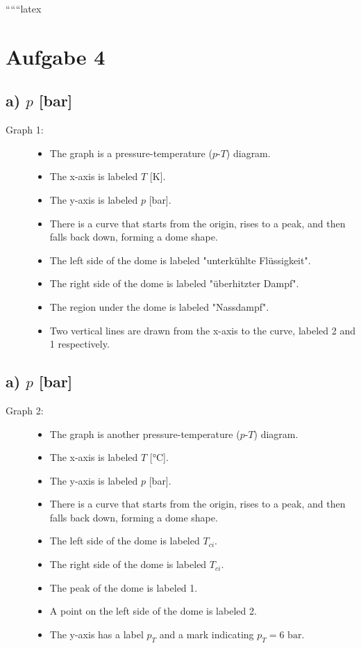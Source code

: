 
``````latex


\section*{Aufgabe 4}

\subsection*{a) $p$ [bar]}

\begin{description}
    \item[Graph 1:] 
    \begin{itemize}
        \item The graph is a pressure-temperature ($p$-$T$) diagram.
        \item The x-axis is labeled $T$ [K].
        \item The y-axis is labeled $p$ [bar].
        \item There is a curve that starts from the origin, rises to a peak, and then falls back down, forming a dome shape.
        \item The left side of the dome is labeled "unterkühlte Flüssigkeit".
        \item The right side of the dome is labeled "überhitzter Dampf".
        \item The region under the dome is labeled "Nassdampf".
        \item Two vertical lines are drawn from the x-axis to the curve, labeled 2 and 1 respectively.
    \end{itemize}
\end{description}

\subsection*{a) $p$ [bar]}

\begin{description}
    \item[Graph 2:] 
    \begin{itemize}
        \item The graph is another pressure-temperature ($p$-$T$) diagram.
        \item The x-axis is labeled $T$ [°C].
        \item The y-axis is labeled $p$ [bar].
        \item There is a curve that starts from the origin, rises to a peak, and then falls back down, forming a dome shape.
        \item The left side of the dome is labeled $T_{ci}$.
        \item The right side of the dome is labeled $T_{ci}$.
        \item The peak of the dome is labeled 1.
        \item A point on the left side of the dome is labeled 2.
        \item The y-axis has a label $p_T$ and a mark indicating $p_T = 6 \text{ bar}$.
    \end{itemize}
\end{description}


